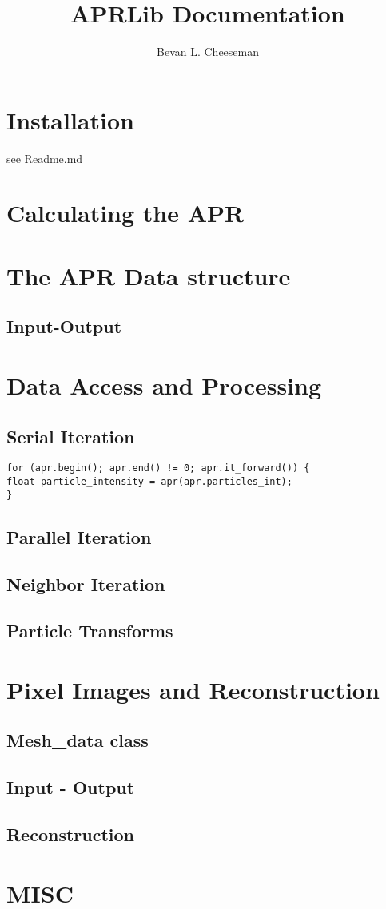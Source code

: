 \documentclass[12pt]{article}
\title{APRLib Documentation}
\author
{Bevan L. Cheeseman}
\begin{document}
\maketitle

\section{Installation}
see Readme.md

\section{Calculating the APR}

\section{The APR Data structure}


\subsection{Input-Output}

\section{Data Access and Processing}


\subsection{Serial Iteration}

\begin{lstlisting}
for (apr.begin(); apr.end() != 0; apr.it_forward()) {
float particle_intensity = apr(apr.particles_int);
}
\end{lstlisting}

\subsection{Parallel Iteration}


\subsection{Neighbor Iteration}


\subsection{Particle Transforms}

\section{Pixel Images and Reconstruction}
\subsection{Mesh\_data class}

\subsection{Input - Output}

\subsection{Reconstruction}

\section{MISC}
\end{document}
